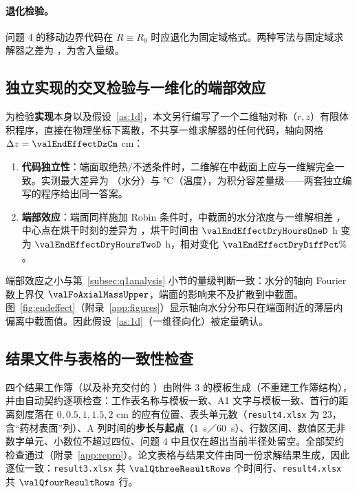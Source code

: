 \paragraph{退化检验。} 问题 4 的移动边界代码在 $R\equiv R_0$ 时应退化为固定域格式。两种写法与固定域求解器之差为 \sci{\valQfourDegenerateMaxDiff}，为舍入量级。

\subsection{独立实现的交叉检验与一维化的端部效应}
\label{subsec:endeffect}

为检验\textbf{实现}本身以及假设~\ref{as:1d}，本文另行编写了一个二维轴对称（$r,z$）有限体积程序，直接在物理坐标下离散，不共享一维求解器的任何代码，轴向网格 $\Delta z=\valEndEffectDzCm$ \si{\centi\meter}：

\begin{enumerate}[leftmargin=*,itemsep=0.2em]
  \item \textbf{代码独立性}：端面取绝热/不透条件时，二维解在中截面上应与一维解完全一致。实测最大差异为 \sci{\valCrossCheckDiffMoist}（水分）与 \sci{\valCrossCheckDiffTemp} \si{\celsius}（温度），为积分容差量级——两套独立编写的程序给出同一答案。
  \item \textbf{端部效应}：端面同样施加 Robin 条件时，中截面的水分浓度与一维解相差 \sci{\valEndEffectMidplaneDiff}，中心点在烘干时刻的差异为 \sci{\valEndEffectCentreDiffAtDry}，烘干时间由 $\valEndEffectDryHoursOneD$ h 变为 $\valEndEffectDryHoursTwoD$ h，相对变化 $\valEndEffectDryDiffPct\%$。
\end{enumerate}

端部效应之小与第~\ref{subsec:q1analysis} 小节的量级判断一致：水分的轴向 Fourier 数上界仅 $\valFoAxialMassUpper$，端面的影响来不及扩散到中截面。图~\ref{fig:endeffect}（附录~\ref{app:figures}）显示轴向水分分布只在端面附近的薄层内偏离中截面值。因此假设~\ref{as:1d}（一维径向化）被定量确认。


\subsection{结果文件与表格的一致性检查}

四个结果工作簿（以及补充交付的 ）由附件 3 的模板生成（不重建工作簿结构），并由自动契约逐项检查：工作表名称与模板一致、A1 文字与模板一致、首行的距离刻度落在 $0,0.5,1,1.5,2$ \si{\centi\meter} 的应有位置、表头单元数（\nolinkurl{result4.xlsx} 为 23，含“药材表面”列）、A 列时间的\textbf{步长与起点}（\SI{1}{\second}／\SI{60}{\second}）、行数区间、数值区无非数字单元、小数位不超过四位、问题 4 中且仅在超出当前半径处留空。全部契约检查通过（附录~\ref{app:repro}）。论文表格与结果文件由同一份求解结果生成，因此逐位一致：\nolinkurl{result3.xlsx} 共 $\valQthreeResultRows$ 个时间行、\nolinkurl{result4.xlsx} 共 $\valQfourResultRows$ 行。

